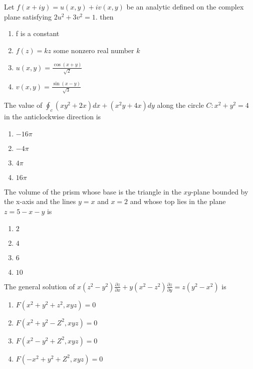 \iffalse
\chapter{2010}
\author{AI24BTECH11027}
\section{xe}
\fi

\item Let $f(x+iy)=u(x,y)+iv(x,y)$ be an analytic defined on the complex plane satisfying $2u^2+3v^2=1.$ then 
\begin{enumerate}
    \item f is a constant
    \item $f(z)=kz$ some nonzero real number $k$
    \item $u(x,y)=\frac{\cos(x+y)}{\sqrt{2}}$
    \item $v(x,y)=\frac{\sin(x-y)}{\sqrt{3}}$ \\
\end{enumerate}

\item The value of $\oint_c (xy^2+2x)dx+(x^2y+4x)dy$ along the circle $C:x^2+y^2=4$ in the anticlockwise direction is
\begin{enumerate}
    \item $-16\pi$
    \item $-4\pi$
    \item $4\pi$
    \item $16\pi$ \\
\end{enumerate}

\item The volume of the prism whose base is the triangle in the $xy$-plane bounded by the x-axis and the lines $y=x$ and $x=2$ and whose top lies in the plane $z=5-x-y$ is 
\begin{enumerate}
    \item $2$
    \item $4$
    \item $6$
    \item $10$ \\
\end{enumerate}

\item The general solution of $x(z^2-y^2)\frac{\partial z}{\partial x}+y(x^2-z^2)\frac{\partial z}{\partial y}=z(y^2-x^2)$ is 
\begin{enumerate}
    \item $F(x^2+y^2+z^2,xyz)=0$
    \item $F(x^2+y^2-Z^2,xyz)=0$
    \item $F(x^2-y^2+Z^2,xyz)=0$
    \item $F(-x^2+y^2+Z^2,xyz)=0$ \\
\end{enumerate}

